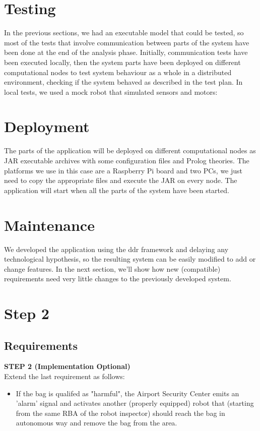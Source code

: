\documentclass{llncs}
\newcommand{\labelsec}[1]{\label{sec:#1}}
\begin{document}
\section{Testing}
\labelsec{testing}
In the previous sections, we had an executable model that could be tested, so most of the tests that involve communication between parts of the system have been done at the end of the analysis phase. Initially, communication tests have been executed locally, then the system parts have been deployed on different computational nodes to test system behaviour as a whole in a distributed environment, checking if the system behaved as described in the test plan.
In local tests, we used a mock robot that simulated sensors and motors:

\section{Deployment}
\labelsec{Deployment}
The parts of the application will be deployed on different computational nodes as JAR executable archives with some configuration files and Prolog theories.
The platforms we use in this case are a Raspberry Pi board and two PCs, we just need to copy the appropriate files and execute the JAR on every node. The application will start when all the parts of the system have been started.
\section{Maintenance}
\labelsec{Maintenance}
We developed the application using the ddr framework and delaying any technological hypothesis, so the resulting system can be easily modified to add or change features. In the next section, we'll show how new (compatible) requirements need very little changes to the previously developed system.
\section{Step 2}
\subsection{Requirements}
\textbf{STEP 2 (Implementation Optional)}\\
Extend the last requirement as follows:
\begin{itemize}
\item If the bag is qualifed as "harmful", the Airport Security Center emits an 'alarm' signal and activates another (properly equipped) robot that (starting from the same RBA of the robot inspector) should reach the bag in autonomous way and remove the bag from the area.
\end{itemize}
\end{document}
